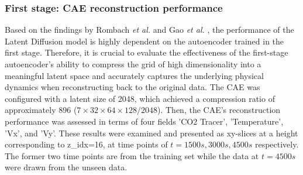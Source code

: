 \documentclass[final-report]{article-template}
\begin{document}
\subsubsection{First stage: CAE reconstruction performance}
Based on the findings by Rombach \textit{et al.} \cite{rombach2022highresolution} and Gao \textit{et al.} \cite{gao2024prediff}, the performance of the Latent Diffusion model is highly dependent on the autoencoder trained in the first stage. Therefore, it is crucial to evaluate the effectiveness of the first-stage autoencoder's ability to compress the grid of high dimensionality into a meaningful latent space and accurately captures the underlying physical dynamics when reconstructing back to the original data. The CAE was configured with a latent size of 2048, which achieved a compression ratio of approximately 896 ($7 \times 32 \times 64 \times 128 / 2048$). Then, the CAE's reconstruction performance was assessed in terms of four fields 'CO2 Tracer', 'Temperature', 'Vx', and 'Vy'. These results were examined and presented as xy-slices at a height corresponding to z\_idx=16, at time points of $t = 1500s, 3000s, 4500s$ respectively. The former two time points are from the training set while the data at $t = 4500s$ were drawn from the unseen data.\\
\end{document}
